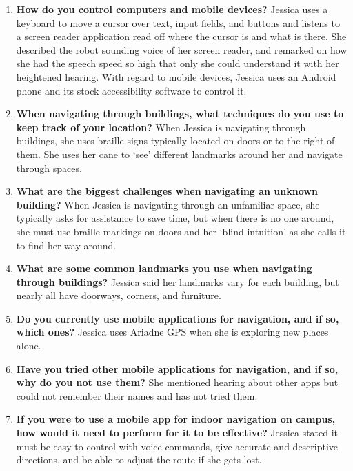 \documentclass{scrreprt}
\begin{document}
\begin{enumerate}
\item \textbf{How do you control computers and mobile devices?}
Jessica uses a keyboard to move a cursor over text, input fields, and buttons and listens to a screen reader application read off where the cursor is and what is there. She described the robot sounding voice of her screen reader, and remarked on how she had the speech speed so high that only she could understand it with her heightened hearing. With regard to mobile devices, Jessica uses an Android phone and its stock accessibility software to control it.
 
\item  \textbf{When navigating through buildings, what techniques do you use to keep track of your location?}
When Jessica is navigating through buildings, she uses braille signs typically located on doors or to the right of them. She uses her cane to ‘see’ different landmarks around her and navigate through spaces.
 
\item \textbf{What are the biggest challenges when navigating an unknown building?}
When Jessica is navigating through an unfamiliar space, she typically asks for assistance to save time, but when there is no one around, she must use braille markings on doors and her ‘blind intuition’ as she calls it to find her way around.
 
\item \textbf{What are some common landmarks you use when navigating through buildings?}
Jessica said her landmarks vary for each building, but nearly all have doorways, corners, and furniture.
 
\item \textbf{Do you currently use mobile applications for navigation, and if so, which ones?}
Jessica uses Ariadne GPS when she is exploring new places alone.
 
\item \textbf{Have you tried other mobile applications for navigation, and if so, why do you not use them?}
She mentioned hearing about other apps but could not remember their names and has not tried them.
 
\item \textbf{If you were to use a mobile app for indoor navigation on campus, how would it need to perform for it to be effective?}
Jessica stated it must be easy to control with voice commands, give accurate and descriptive directions, and be able to adjust the route if she gets lost.
 

\end{enumerate}
\end{document}
